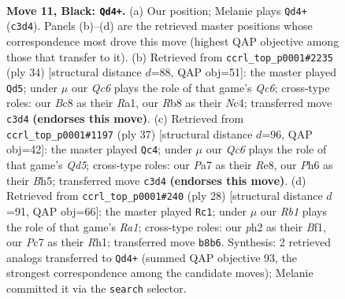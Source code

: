 \documentclass[11pt]{article}
\begin{document}
\clearpage

\begin{figure}[p]\centering
\begin{subfigure}{0.46\textwidth}\centering
\resizebox{\linewidth}{!}{%
\newchessgame
\chessboard[
  setfen={1rb1k2r/p1pp1pp1/2p4p/8/4P3/P1q5/P1P2PPP/R1QK1B1R b k - 1 11},
  showmover=false,
  pgfstyle=straightmove, color=movearrow, markmove={c3-d4}
]}
\caption{}
\end{subfigure}\hfill
\begin{subfigure}{0.46\textwidth}\centering
\resizebox{\linewidth}{!}{%
\newchessgame
\chessboard[
  setfen={r2qr2k/p1pn2pp/2Q5/4p3/2N5/2PpPP1P/PP5K/R4R2 w - - 1 18},
  showmover=false,
  pgfstyle=straightmove, color=movearrow, markmove={c6-d5}
]}
\caption{}
\end{subfigure}
\\[4pt]
\begin{subfigure}{0.46\textwidth}\centering
\resizebox{\linewidth}{!}{%
\newchessgame
\chessboard[
  setfen={r3r3/pp3ppk/8/2p4b/3q4/2P3PP/PP1Q1P2/R1B2RK1 b - - 0 19},
  showmover=false,
  pgfstyle=straightmove, color=movearrow, markmove={d4-c4}
]}
\caption{}
\end{subfigure}\hfill
\begin{subfigure}{0.46\textwidth}\centering
\resizebox{\linewidth}{!}{%
\newchessgame
\chessboard[
  setfen={rnbr4/pp3pkp/3q2p1/2p3Q1/4P2P/5P2/PP2N1P1/R3KB1R w KQ - 0 15},
  showmover=false,
  pgfstyle=straightmove, color=movearrow, markmove={a1-c1}
]}
\caption{}
\end{subfigure}
\caption{\textbf{Move 11, Black: \texttt{Qd4+}.} (a) Our position; Melanie plays \texttt{Qd4+} (\texttt{c3d4}). Panels (b)--(d) are the retrieved master positions whose correspondence most drove this move (highest QAP objective among those that transfer to it). (b) Retrieved from \texttt{ccrl\_top\_p0001\#2235} (ply 34) [structural distance $d$=88, QAP obj=51]: the master played \texttt{Qd5}; under $\mu$ our \emph{Qc6} plays the role of that game's \emph{Qc6}; cross-type roles: our \emph{B}c8 as their \emph{R}a1, our \emph{R}b8 as their \emph{N}c4; transferred move \texttt{c3d4} \textbf{(endorses this move)}. (c) Retrieved from \texttt{ccrl\_top\_p0001\#1197} (ply 37) [structural distance $d$=96, QAP obj=42]: the master played \texttt{Qc4}; under $\mu$ our \emph{Qc6} plays the role of that game's \emph{Qd5}; cross-type roles: our \emph{P}a7 as their \emph{R}e8, our \emph{P}h6 as their \emph{B}h5; transferred move \texttt{c3d4} \textbf{(endorses this move)}. (d) Retrieved from \texttt{ccrl\_top\_p0001\#240} (ply 28) [structural distance $d$=91, QAP obj=66]: the master played \texttt{Rc1}; under $\mu$ our \emph{Rb1} plays the role of that game's \emph{Ra1}; cross-type roles: our \emph{p}h2 as their \emph{B}f1, our \emph{P}c7 as their \emph{R}h1; transferred move \texttt{b8b6}. Synthesis: 2 retrieved analogs transferred to \texttt{Qd4+} (summed QAP objective 93, the strongest correspondence among the candidate moves); Melanie committed it via the \texttt{search} selector.}
\label{fig:thought-m21}
\end{figure}
\end{document}
